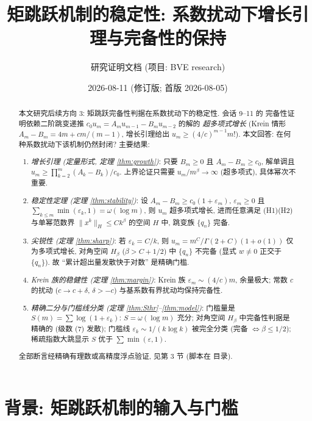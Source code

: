 \documentclass[UTF8]{ctexart}
\title{矩跳跃机制的稳定性: 系数扰动下增长引理与完备性的保持}
\author{研究证明文档 (项目: BVE research)}
\date{2026-08-11 (修订版; 首版 2026-08-05)}
\begin{document}
\maketitle

\begin{abstract}
本文研究后续方向 3: 矩跳跃完备性判据在系数扰动下的稳定性. 会话 9--11 的
完备性证明依赖二阶跳变递推 $c_0 u_m = A_m u_{m-1} - B_m u_{m-2}$ 的解的
\emph{超多项式增长} (Krein 情形 $A_m - B_m = 4m + cm/(m-1)$, 增长引理给出
$u_m \geq (4/c)^{m-1} m!$). 本文回答: 在何种系数扰动下该机制仍然封闭?
主要结果:
\begin{enumerate}
	\item \emph{增长引理 (定量形式, 定理 \ref{thm:growth})}: 只要 $B_m \geq 0$
		且 $A_m - B_m \geq c_0$, 解单调且 $u_m \geq \prod_{k=2}^m (A_k-B_k)/c_0$.
		上界论证只需要 $u_m/m^\beta \to \infty$ (超多项式), 具体幂次不重要.
	\item \emph{稳定性定理 (定理 \ref{thm:stability})}: 设
		$A_m - B_m \geq c_0(1+\varepsilon_m)$, $\varepsilon_m \geq 0$ 且
		$\sum_{k \leq m} \min(\varepsilon_k, 1) = \omega(\log m)$, 则
		$u_m$ 超多项式增长, 进而任意满足 (H1)(H2) 与单幂范数界
		$\|x^k\|_H \leq C k^\beta$ 的空间 $H$ 中, 跳变族 $\{q_n\}$ 完备.
	\item \emph{尖锐性 (定理 \ref{thm:sharp})}: 若 $\varepsilon_k = C/k$, 则
		$u_m = m^C/\Gamma(2+C)(1+o(1))$ 仅为多项式增长, 对角空间
		$H_\beta$ ($\beta > C+1/2$) 中 $\{q_n\}$ 不完备 (显式
		$w \neq 0$ 正交于 $\{q_n\}$). 故 ``累计超出量发散快于对数''
		是精确门槛.
	\item \emph{Krein 族的稳健性 (定理 \ref{thm:margin})}: Krein 族
		$\varepsilon_m \sim (4/c)m$, 余量极大; 常数 $c$ 的扰动
		($c \to c+\delta$, $\delta > -c$) 与基系数有界扰动均保持完备性.
	\item \emph{精确二分与门槛线分类 (定理 \ref{thm:Sthr}--\ref{thm:model})}:
		门槛量是 $S(m) = \sum \log(1+\varepsilon_k)$: $S = \omega(\log m)$
		充分; 对角空间 $H_\beta$ 中完备性判据是精确的
		(级数 (7) 发散); 门槛线 $\varepsilon_k \sim 1/(k\log k)$ 被完全分类
		(完备 $\iff \beta \leq 1/2$); 稀疏指数大跳显示 $S$ 优于
		$\sum\min(\varepsilon,1)$.
\end{enumerate}
全部断言经精确有理数或高精度浮点验证, 见第 3 节 (脚本在  目录).
\end{abstract}

\tableofcontents

\section{背景: 矩跳跃机制的输入与门槛}
\end{document}
